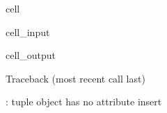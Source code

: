\documentclass[letterpaper,10pt,english]{jupyterBook}
\begin{document}
\begin{sphinxuseclass}{cell}\begin{sphinxVerbatimInput}

\begin{sphinxuseclass}{cell_input}
\begin{sphinxVerbatim}[commandchars=\\\{\}]
\end{sphinxVerbatim}

\end{sphinxuseclass}\end{sphinxVerbatimInput}
\begin{sphinxVerbatimOutput}

\begin{sphinxuseclass}{cell_output}
\begin{sphinxVerbatim}[commandchars=\\\{\}]
Traceback (most recent call last)
 \PYG{p}{[}\PYG{p}{]}  
 

: \PYGZsq{}tuple\PYGZsq{} object has no attribute \PYGZsq{}insert\PYGZsq{}
\end{sphinxVerbatim}

\end{sphinxuseclass}\end{sphinxVerbatimOutput}

\end{sphinxuseclass}
\end{document}
